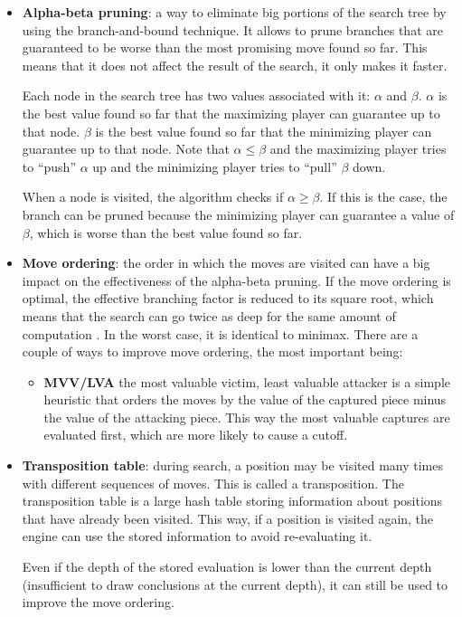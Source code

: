 \begin{itemize}
\item \textbf{Alpha-beta pruning}: a way to eliminate big portions of the search tree by using the branch-and-bound technique. It allows to prune branches that are guaranteed to be worse than the most promising move found so far. This means that it does not affect the result of the search, it only makes it faster.

Each node in the search tree has two values associated with it: $\alpha$ and $\beta$. $\alpha$ is the best value found so far that the maximizing player can guarantee up to that node. $\beta$ is the best value found so far that the minimizing player can guarantee up to that node. Note that $\alpha \le \beta$ and the maximizing player tries to \enquote{push} $\alpha$ up and the minimizing player tries to \enquote{pull} $\beta$ down.

When a node is visited, the algorithm checks if $\alpha \ge \beta$. If this is the case, the branch can be pruned because the minimizing player can guarantee a value of $\beta$, which is worse than the best value found so far.

\item \textbf{Move ordering}: the order in which the moves are visited can have a big impact on the effectiveness of the alpha-beta pruning. If the move ordering is optimal, the effective branching factor is reduced to its square root, which means that the search can go twice as deep for the same amount of computation \cite[section 5.3.1]{ai_modern_approach}. In the worst case, it is identical to minimax. There are a couple of ways to improve move ordering, the most important being:
\begin{itemize}
\item \textbf{MVV/LVA} the most valuable victim, least valuable attacker is a simple heuristic that orders the moves by the value of the captured piece minus the value of the attacking piece. This way the most valuable captures are evaluated first, which are more likely to cause a cutoff.
\end{itemize}

\item \textbf{Transposition table}: during search, a position may be visited many times with different sequences of moves. This is called a transposition. The transposition table is a large hash table storing information about positions that have already been visited. This way, if a position is visited again, the engine can use the stored information to avoid re-evaluating it.

Even if the depth of the stored evaluation is lower than the current depth (insufficient to draw conclusions at the current depth), it can still be used to improve the move ordering.

\end{itemize}

